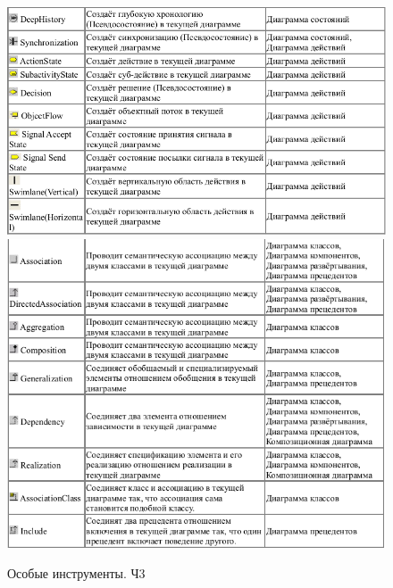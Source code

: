 \documentclass[a4paper,12pt]{report}
\begin{document}
\begin{figure}
	\centering
	\includegraphics[width=0.9\linewidth]{images/diffinstruments4}
	\includegraphics[width=0.9055\linewidth]{images/diffinstruments5}
	\caption{Особые инструменты. Ч3}
	\label{fig:diffinstruments3}
\end{figure}
\end{document}
